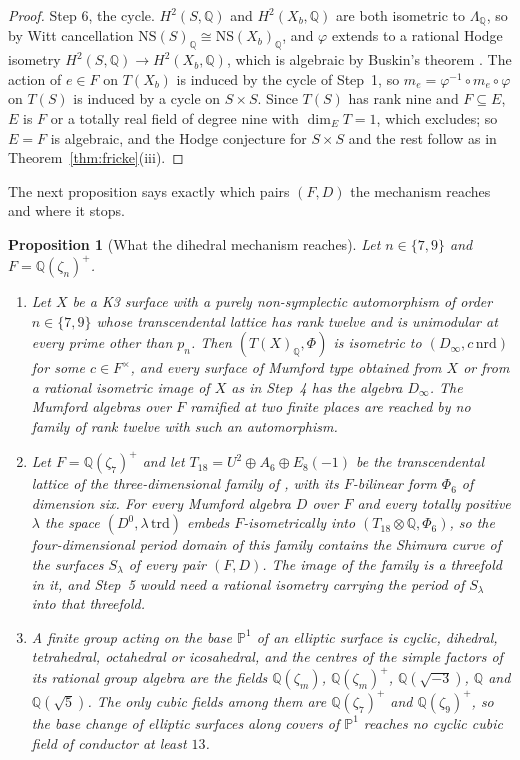 \documentclass[11pt,reqno]{amsart}
\numberwithin{equation}{section}
\theoremstyle{plain}
\newtheorem{proposition}[theorem]{Proposition}
\theoremstyle{definition}
\newcommand{\QQ}{\mathbb{Q}}
\newcommand{\NS}{\mathrm{NS}}
\newcommand{\nrd}{\mathrm{nrd}}
\begin{document}
\begin{proof}
Step 6, the cycle. $H^{2}(S,\QQ)$ and $H^{2}(X_{b},\QQ)$ are both isometric to $\Lambda_{\QQ}$, so by Witt cancellation $\NS(S)_{\QQ}\cong\NS(X_{b})_{\QQ}$, and $\varphi$ extends to a rational Hodge isometry $H^{2}(S,\QQ)\to H^{2}(X_{b},\QQ)$, which is algebraic by Buskin's theorem \cite{Bus19}. The action of $e\in F$ on $T(X_{b})$ is induced by the cycle of Step~1, so $m_{e}=\varphi^{-1}\circ m_{e}\circ\varphi$ on $T(S)$ is induced by a cycle on $S\times S$. Since $T(S)$ has rank nine and $F\subseteq E$, $E$ is $F$ or a totally real field of degree nine with $\dim_{E}T=1$, which \cite{vG08} excludes; so $E=F$ is algebraic, and the Hodge conjecture for $S\times S$ and the rest follow as in Theorem~\ref{thm:fricke}(iii).
\end{proof}

The next proposition says exactly which pairs $(F,D)$ the mechanism reaches and where it stops.

\begin{proposition}[What the dihedral mechanism reaches]\label{prop:cubicstop}
Let $n\in\{7,9\}$ and $F=\QQ(\zeta_{n})^{+}$.
\begin{enumerate}[label=\textup{(\roman*)},leftmargin=2.4em,itemsep=2pt]
\item Let $X$ be a K3 surface with a purely non-symplectic automorphism of order $n\in\{7,9\}$ whose transcendental lattice has rank twelve and is unimodular at every prime other than $p_{n}$. Then $(T(X)_{\QQ},\Phi)$ is isometric to $(D_{\infty},c\,\nrd)$ for some $c\in F^{\times}$, and every surface of Mumford type obtained from $X$ or from a rational isometric image of $X$ as in Step~4 has the algebra $D_{\infty}$. The Mumford algebras over $F$ ramified at two finite places are reached by no family of rank twelve with such an automorphism.
\item Let $F=\QQ(\zeta_{7})^{+}$ and let $T_{18}=U^{2}\oplus A_{6}\oplus E_{8}(-1)$ be the transcendental lattice of the three-dimensional family of \cite[\S5.4]{vGS25}, with its $F$-bilinear form $\Phi_{6}$ of dimension six. For every Mumford algebra $D$ over $F$ and every totally positive $\lambda$ the space $(D^{0},\lambda\,\mathrm{trd})$ embeds $F$-isometrically into $(T_{18}\otimes\QQ,\Phi_{6})$, so the four-dimensional period domain of this family contains the Shimura curve of the surfaces $S_{\lambda}$ of every pair $(F,D)$. The image of the family is a threefold in it, and Step~5 would need a rational isometry carrying the period of $S_{\lambda}$ into that threefold.
\item A finite group acting on the base $\mathbb{P}^{1}$ of an elliptic surface is cyclic, dihedral, tetrahedral, octahedral or icosahedral, and the centres of the simple factors of its rational group algebra are the fields $\QQ(\zeta_{m})$, $\QQ(\zeta_{m})^{+}$, $\QQ(\sqrt{-3})$, $\QQ$ and $\QQ(\sqrt5)$. The only cubic fields among them are $\QQ(\zeta_{7})^{+}$ and $\QQ(\zeta_{9})^{+}$, so the base change of elliptic surfaces along covers of $\mathbb{P}^{1}$ reaches no cyclic cubic field of conductor at least $13$.
\end{enumerate}
\end{proposition}
\end{document}
